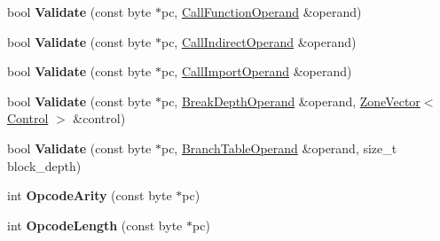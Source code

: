 \begin{DoxyCompactItemize}
\item 
bool {\bfseries Validate} (const byte $\ast$pc, \hyperlink{structv8_1_1internal_1_1wasm_1_1_call_function_operand}{Call\+Function\+Operand} \&operand)\hypertarget{classv8_1_1internal_1_1wasm_1_1_wasm_decoder_aa9c457e41e71b6889fc9c0da5b4aaf1a}{}\label{classv8_1_1internal_1_1wasm_1_1_wasm_decoder_aa9c457e41e71b6889fc9c0da5b4aaf1a}

\item 
bool {\bfseries Validate} (const byte $\ast$pc, \hyperlink{structv8_1_1internal_1_1wasm_1_1_call_indirect_operand}{Call\+Indirect\+Operand} \&operand)\hypertarget{classv8_1_1internal_1_1wasm_1_1_wasm_decoder_ab2d2534daa7fb9dd2cc1e9ae33d2fe46}{}\label{classv8_1_1internal_1_1wasm_1_1_wasm_decoder_ab2d2534daa7fb9dd2cc1e9ae33d2fe46}

\item 
bool {\bfseries Validate} (const byte $\ast$pc, \hyperlink{structv8_1_1internal_1_1wasm_1_1_call_import_operand}{Call\+Import\+Operand} \&operand)\hypertarget{classv8_1_1internal_1_1wasm_1_1_wasm_decoder_a669d4411a9527760e880cecc6c89aa2e}{}\label{classv8_1_1internal_1_1wasm_1_1_wasm_decoder_a669d4411a9527760e880cecc6c89aa2e}

\item 
bool {\bfseries Validate} (const byte $\ast$pc, \hyperlink{structv8_1_1internal_1_1wasm_1_1_break_depth_operand}{Break\+Depth\+Operand} \&operand, \hyperlink{classv8_1_1internal_1_1_zone_vector}{Zone\+Vector}$<$ \hyperlink{structv8_1_1internal_1_1wasm_1_1_control}{Control} $>$ \&control)\hypertarget{classv8_1_1internal_1_1wasm_1_1_wasm_decoder_a7fe4ae12ef8ea61cb832a020ea1814d6}{}\label{classv8_1_1internal_1_1wasm_1_1_wasm_decoder_a7fe4ae12ef8ea61cb832a020ea1814d6}

\item 
bool {\bfseries Validate} (const byte $\ast$pc, \hyperlink{structv8_1_1internal_1_1wasm_1_1_branch_table_operand}{Branch\+Table\+Operand} \&operand, size\+\_\+t block\+\_\+depth)\hypertarget{classv8_1_1internal_1_1wasm_1_1_wasm_decoder_aa4c166210cb497267be21851344fa5ab}{}\label{classv8_1_1internal_1_1wasm_1_1_wasm_decoder_aa4c166210cb497267be21851344fa5ab}

\item 
int {\bfseries Opcode\+Arity} (const byte $\ast$pc)\hypertarget{classv8_1_1internal_1_1wasm_1_1_wasm_decoder_a9c0918270ead8723e095f05f0b95485f}{}\label{classv8_1_1internal_1_1wasm_1_1_wasm_decoder_a9c0918270ead8723e095f05f0b95485f}

\item 
int {\bfseries Opcode\+Length} (const byte $\ast$pc)\hypertarget{classv8_1_1internal_1_1wasm_1_1_wasm_decoder_a5216c3f10335278a51453558384c7793}{}\label{classv8_1_1internal_1_1wasm_1_1_wasm_decoder_a5216c3f10335278a51453558384c7793}

\end{DoxyCompactItemize}
